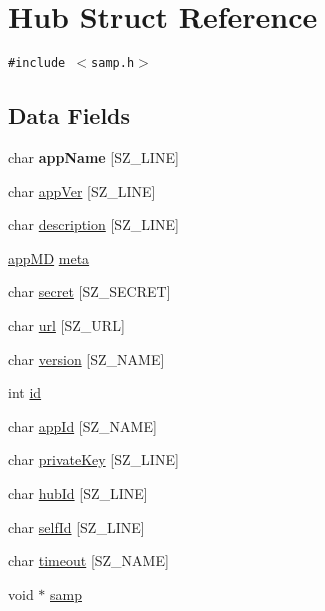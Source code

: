 \hypertarget{structHub}{
\section{Hub Struct Reference}
\label{structHub}
}
{\tt \#include $<$samp.h$>$}

\subsection*{Data Fields}
\begin{CompactItemize}
\item 
\hypertarget{structHub_2afdf379c978a0a93b1213d1469f5bd5}{
char \textbf{appName} \mbox{[}SZ\_\-LINE\mbox{]}}
\label{structHub_2afdf379c978a0a93b1213d1469f5bd5}

\item 
char \hyperlink{structHub_b6cbad1270ab46610f03837d4a01648f}{appVer} \mbox{[}SZ\_\-LINE\mbox{]}
\item 
char \hyperlink{structHub_d96b607b83480697b7147f95f84132fb}{description} \mbox{[}SZ\_\-LINE\mbox{]}
\item 
\hyperlink{structappMD}{appMD} \hyperlink{structHub_cfe9051f3f0d6fd908ddf394283d1262}{meta}
\item 
char \hyperlink{structHub_52a6b65f54e98c4f3b7441808e30fa6c}{secret} \mbox{[}SZ\_\-SECRET\mbox{]}
\item 
char \hyperlink{structHub_81adb6d0cab27f61c0aaebbb7b7685e4}{url} \mbox{[}SZ\_\-URL\mbox{]}
\item 
char \hyperlink{structHub_0e07ef26e39ed1282042364297591df5}{version} \mbox{[}SZ\_\-NAME\mbox{]}
\item 
int \hyperlink{structHub_3546ac45740591096b9bdc4c37b8d5f5}{id}
\item 
char \hyperlink{structHub_83ae1eed61525e4dd8795d7076b9a844}{appId} \mbox{[}SZ\_\-NAME\mbox{]}
\item 
char \hyperlink{structHub_53b0a5acf4419ffff98c6510e84a9f62}{privateKey} \mbox{[}SZ\_\-LINE\mbox{]}
\item 
char \hyperlink{structHub_c5ecb8cd6b3d61ab9e0fddfb643c65c3}{hubId} \mbox{[}SZ\_\-LINE\mbox{]}
\item 
char \hyperlink{structHub_ce254c7adba1a20deb1dff7e112dd2a8}{selfId} \mbox{[}SZ\_\-LINE\mbox{]}
\item 
char \hyperlink{structHub_b69adb014b0cef61d6632e60fb2dff5b}{timeout} \mbox{[}SZ\_\-NAME\mbox{]}
\item 
void $\ast$ \hyperlink{structHub_cfd1b13e1f462d6595ce4e0b5ab08cb9}{samp}
\end{CompactItemize}


